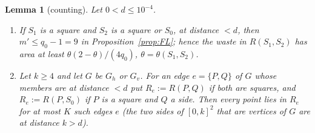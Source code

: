 \documentclass[11pt]{amsart}
\newtheorem{lemma}[theorem]{Lemma}
\theoremstyle{definition}
\theoremstyle{remark}
\begin{document}
\begin{lemma}[counting]\label{lem:count}
Let $0<d\le10^{-4}$.
\begin{enumerate}[label=(\alph*)]
\item If $S_1$ is a square and $S_2$ is a square or $S_0$, at distance $<d$, then $m'\le q_0-1=9$ in
Proposition~\ref{prop:FL}; hence the waste in $R(S_1,S_2)$ has area at least $\theta(2-\theta)/(4q_0)$, $\theta=\theta(S_1,S_2)$.
\item Let $k\ge4$ and let $G$ be $G_h$ or $G_v$. For an edge $e=\{P,Q\}$ of $G$ whose members are at distance $<d$ put $R_e:=R(P,Q)$ if
both are squares, and $R_e:=R(P,S_0)$ if $P$ is a square and $Q$ a side. Then every point lies in $R_e$ for at most $K$
such edges $e$ \textup{(}the two sides of $[0,k]^2$ that are vertices of $G$ are at distance $k>d$\textup{)}.
\end{enumerate}
\end{lemma}
\end{document}
